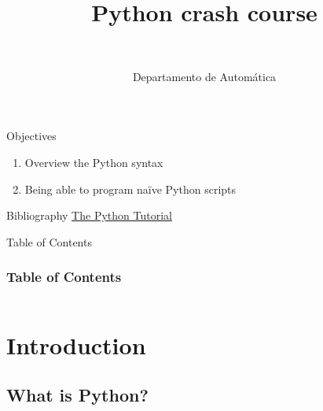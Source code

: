 \documentclass[10pt,compress]{beamer} %
\title[Python crash course]{Python crash course}
\author{\asignatura\\\carrera}
\institute{}
\date{Departamento de Automática}
\begin{document}
{\titlepageBlue
    \begin{frame}
        \titlepage
    \end{frame}
}

\institute{\asignatura}

\begin{frame}[plain]{}
	\begin{block}{Objectives}
		\begin{enumerate}
		\item Overview the Python syntax
		\item Being able to program na\"ive Python scripts
		\end{enumerate}
	\end{block}

	\begin{block}{Bibliography}
        \href{https://docs.python.org/3/tutorial/}{The Python Tutorial}
	\end{block}
\end{frame}

{
\begin{frame}[shrink]{Table of Contents}
 \frametitle{Table of Contents}
     \begin{columns}[t]
        \begin{column}{.5\textwidth}
            \tableofcontents[sections={1-3}]
        \end{column}
        \begin{column}{.5\textwidth}
            \tableofcontents[sections={4-7}]
        \end{column}
    \end{columns}
\end{frame}
}

\section{Introduction}
\subsection{What is Python?}
\end{document}

